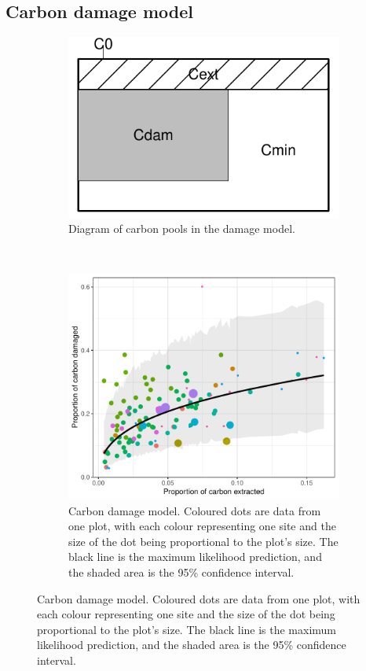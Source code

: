 \documentclass[12pt]{article}
\begin{document}
\subsection{Carbon damage model}
\label{supmat:cdam}

\begin{figure}
    \centering
    \begin{subfigure}[b]{0.3\textwidth}
        \includegraphics[width=\linewidth]{graphs/schemaDam.pdf}
        \caption{Diagram of carbon pools in the damage model.}\label{fig:schemaDam}
    \end{subfigure}
    ~ 
    \begin{subfigure}[b]{0.55\textwidth}
    \includegraphics[width=\linewidth]{graphs/damModel.pdf}
    \caption{Carbon damage model. Coloured dots are data from one plot, with each colour representing one site and the size of the dot being proportional to the plot's size. The black line is the maximum likelihood prediction, and the shaded area is the 95\% confidence interval.}\label{fig:damModel}
    \end{subfigure}
\end{figure}
\end{document}
